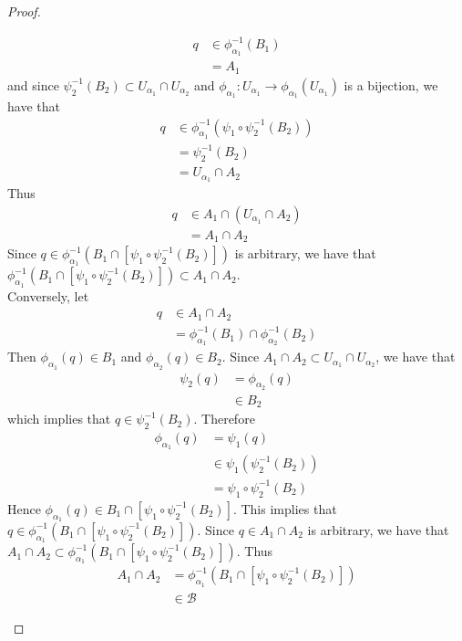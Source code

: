 \documentclass{book}
\theoremstyle{definition}
\newcommand{\al}{\alpha}
\newcommand{\MB}{\mathcal{B}}
\DeclareMathOperator*{\0}{\mbf{0}}
\DeclareMathOperator*{\1}{\mbf{1}}
\begin{document}
\begin{proof}
\begin{enumerate}
\begin{itemize}
\begin{align*}
				q 
				& \in \phi_{\al_1}^{-1}(B_1) \\
				& = A_1
			\end{align*}
			and since $\psi_2^{-1}(B_2) \subset U_{\al_1} \cap U_{\al_2}$ and $\phi_{\al_1}: U_{\al_1} \rightarrow \phi_{\al_1}(U_{\al_1})$ is a bijection, we have that
			\begin{align*}
				q 
				& \in \phi_{\al_1}^{-1}(\psi_1 \circ \psi_2^{-1}(B_2)) \\
				& = \psi_2^{-1}(B_2) \\
				& = U_{\al_1} \cap A_2 
			\end{align*} 
			Thus 
			\begin{align*}
				q 
				& \in A_1 \cap (U_{\al_1} \cap A_2) \\
				& = A_1 \cap A_2
			\end{align*}
			Since $q \in \phi_{\al_1}^{-1}(B_1 \cap [\psi_1 \circ \psi_2^{-1}(B_2)])$ is arbitrary, we have that $\phi_{\al_1}^{-1}(B_1 \cap [\psi_1 \circ \psi_2^{-1}(B_2)]) \subset A_1 \cap A_2$. \\
			Conversely, let  
			\begin{align*}
				q 
				& \in A_1 \cap A_2 \\ 
				& = \phi_{\al_1}^{-1}(B_1) \cap \phi_{\al_2}^{-1}(B_2)
			\end{align*}
			Then $\phi_{\al_1}(q) \in B_1$ and $\phi_{\al_2}(q) \in B_2$. Since $A_1 \cap A_2 \subset U_{\al_1} \cap U_{\al_2}$, we have that 
			\begin{align*}
				\psi_2(q)
				& = \phi_{\al_2}(q) \\
				& \in B_2
			\end{align*}
			which implies that $q \in \psi_2^{-1}(B_2)$. Therefore 
			\begin{align*}
				\phi_{\al_1}(q)
				& = \psi_1(q) \\
				& \in \psi_1 ( \psi_2^{-1}(B_2)) \\
				& =  \psi_1 \circ \psi_2^{-1}(B_2) 
			\end{align*}
			Hence $\phi_{\al_1}(q) \in B_1 \cap [\psi_1 \circ \psi_2^{-1}(B_2)]$. This implies that $q \in \phi_{\al_1}^{-1}( B_1 \cap [\psi_1 \circ \psi_2^{-1}(B_2)])$. Since $q \in A_1 \cap A_2$ is arbitrary, we have that $A_1 \cap A_2 \subset \phi_{\al_1}^{-1}( B_1 \cap [\psi_1 \circ \psi_2^{-1}(B_2)])$. Thus 
			\begin{align*}
				A_1 \cap A_2 
				& = \phi_{\al_1}^{-1}( B_1 \cap [\psi_1 \circ \psi_2^{-1}(B_2)]) \\
				& \in \MB
			\end{align*}

\end{itemize}
\end{enumerate}
\end{proof}
\end{document}
